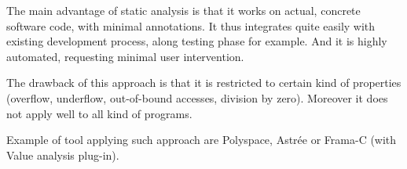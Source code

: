 The main advantage of static analysis is that it works on actual,
concrete software code, with minimal annotations. It thus integrates
quite easily with existing development process, along testing phase
for example. And it is highly automated, requesting minimal user
intervention.

The drawback of this approach is that it is restricted to certain kind
of properties (overflow, underflow, out-of-bound accesses, division by
zero). Moreover it does not apply well to all kind of programs.


Example of tool applying such approach are Polyspace, Astrée or
Frama-C (with Value analysis plug-in).



















